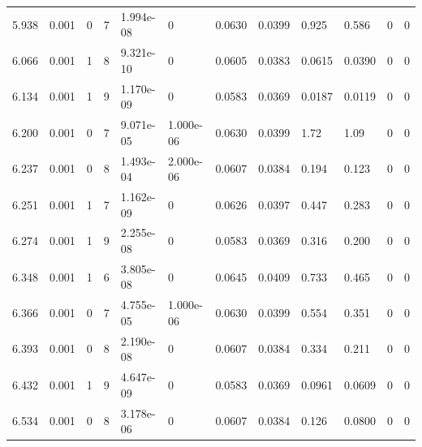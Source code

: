 \documentclass[preview]{standalone}
\begin{document}
{{{\begin{tabular}{L{1.2cm}C{1.2cm} C{0.3cm}C{0.5cm} C{1.4cm}C{1.4cm} C{1.4cm}C{1.4cm} C{1.6cm}C{1.6cm} C{1.6cm}C{1.6cm}}
  5.938  &  0.001  & 0     &  7 &  1.994e-08  & 0  &  0.0630&   0.0399& 0.925 & 0.586   &  0 & 0  \\ 
  6.066  &  0.001  & 1     &  8 &  9.321e-10  & 0  &  0.0605&   0.0383& 0.0615 & 0.0390   &  0 & 0  \\ 
  6.134  &  0.001  & 1     &  9 &  1.170e-09  & 0  &  0.0583&   0.0369& 0.0187 & 0.0119   &  0 & 0  \\ 
  6.200  &  0.001  & 0     &  7 &  9.071e-05  & 1.000e-06  &  0.0630&   0.0399& 1.72 & 1.09   &  0 & 0  \\ 
  6.237  &  0.001  & 0     &  8 &  1.493e-04  & 2.000e-06  &  0.0607&   0.0384& 0.194 & 0.123   &  0 & 0  \\ 
  6.251  &  0.001  & 1     &  7 &  1.162e-09  & 0  &  0.0626&   0.0397& 0.447 & 0.283   &  0 & 0  \\ 
  6.274  &  0.001  & 1     &  9 &  2.255e-08  & 0  &  0.0583&   0.0369& 0.316 & 0.200   &  0 & 0  \\ 
  6.348  &  0.001  & 1     &  6 &  3.805e-08  & 0  &  0.0645&   0.0409& 0.733 & 0.465   &  0 & 0  \\ 
  6.366  &  0.001  & 0     &  7 &  4.755e-05  & 1.000e-06  &  0.0630&   0.0399& 0.554 & 0.351   &  0 & 0  \\ 
  6.393  &  0.001  & 0     &  8 &  2.190e-08  & 0  &  0.0607&   0.0384& 0.334 & 0.211   &  0 & 0  \\ 
  6.432  &  0.001  & 1     &  9 &  4.647e-09  & 0  &  0.0583&   0.0369& 0.0961 & 0.0609   &  0 & 0  \\ 
  6.534  &  0.001  & 0     &  8 &  3.178e-06  & 0  &  0.0607&   0.0384& 0.126 & 0.0800   &  0 & 0  \\ 
\hline 
\end{tabular} 

}}}
\end{document}
